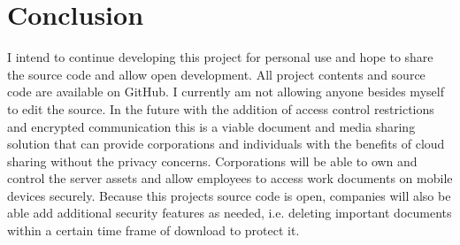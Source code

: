 \documentclass[12pt]{article}
\begin{document}
\section{Conclusion}

I intend to continue developing this project for personal use and hope to share the source code and allow open development. All project contents and source code are available on GitHub. I currently am not allowing anyone besides myself to edit the source. In the future with the addition of access control restrictions and encrypted communication this is a viable document and media sharing solution that can provide corporations and individuals with the benefits of cloud sharing without the privacy concerns. Corporations will be able to own and control the server assets and allow employees to access work documents on mobile devices securely. Because this projects source code is open, companies will also be able add additional security features as needed, i.e. deleting important documents within a certain time frame of download to protect it. 
\end{document}
